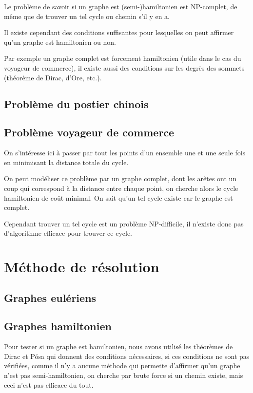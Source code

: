 \documentclass{scrartcl}
\begin{document}
    Le problème de savoir si un graphe est (semi-)hamiltonien est NP-complet,
    de même que de trouver un tel cycle ou chemin s'il y en a.

    Il existe cependant des conditions suffisantes pour lesquelles on peut
    affirmer qu'un graphe est hamiltonien ou non.

    Par exemple un graphe complet est forcement hamiltonien (utile dans le cas
    du voyageur de commerce), il existe aussi des conditions sur les degrès des
    sommets (théorème de Dirac, d'Ore, etc.).

  \subsection{Problème du postier chinois}
  \subsection{Problème voyageur de commerce}
    On s'intéresse ici à passer par tout les points d'un ensemble une et une
    seule fois en minimisant la distance totale du cycle.

    On peut modéliser ce problème par un graphe complet, dont les arêtes ont un
    coup qui correspond à la distance entre chaque point, on cherche alors le
    cycle hamiltonien de coût minimal. On sait qu'un tel cycle existe car le
    graphe est complet.

    Cependant trouver un tel cycle est un problème NP-difficile, il n'existe
    donc pas d'algorithme efficace pour trouver ce cycle.

\section{Méthode de résolution}
  \subsection{Graphes eulériens}
    
  
  \subsection{Graphes hamiltonien}
    Pour tester si un graphe est hamiltonien, nous avons utilisé les théorèmes
    de Dirac et Pósa qui donnent des conditions nécessaires, si ces conditions
    ne sont pas vérifiées, comme il n'y a aucune méthode qui permette
    d'affirmer qu'un graphe n'est pas semi-hamiltonien, on cherche par brute
    force si un chemin existe, mais ceci n'est pas efficace du tout.
\end{document}
